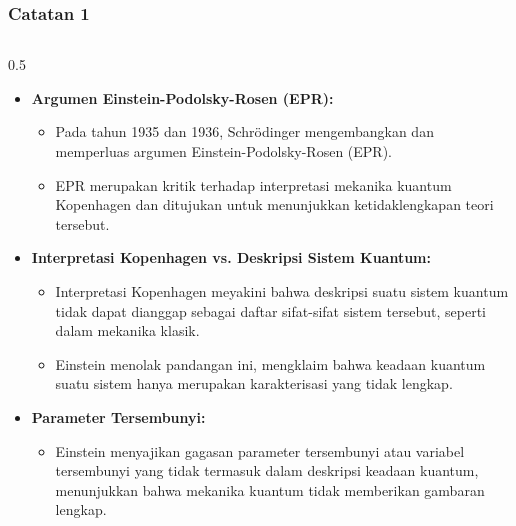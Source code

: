 \begin{frame}
\frametitle{Catatan 1}
    \begin{columns} %
        \begin{column}{0.5\textwidth}
        \justifying %
        \tiny %
        \vspace{-0.5 cm}
            \begin{itemize}
            \justifying %
            \tiny %
                \item \textbf{Argumen Einstein-Podolsky-Rosen (EPR):}
                    \begin{itemize}      \justifying \tiny 
                        \item Pada tahun 1935 dan 1936, Schrödinger mengembangkan dan memperluas argumen Einstein-Podolsky-Rosen (EPR).
                        \item EPR merupakan kritik terhadap interpretasi mekanika kuantum Kopenhagen dan ditujukan untuk menunjukkan ketidaklengkapan teori tersebut.
                    \end{itemize}
                
                \item \textbf{Interpretasi Kopenhagen vs. Deskripsi Sistem Kuantum:}
                    \begin{itemize} \justifying \tiny 
                        \item Interpretasi Kopenhagen meyakini bahwa deskripsi suatu sistem kuantum tidak dapat dianggap sebagai daftar sifat-sifat sistem tersebut, seperti dalam mekanika klasik.
                        \item Einstein menolak pandangan ini, mengklaim bahwa keadaan kuantum suatu sistem hanya merupakan karakterisasi yang tidak lengkap.
                    \end{itemize}
                
                \item \textbf{Parameter Tersembunyi:}
                    \begin{itemize} \justifying \tiny 
                        \item Einstein menyajikan gagasan parameter tersembunyi atau variabel tersembunyi yang tidak termasuk dalam deskripsi keadaan kuantum, menunjukkan bahwa mekanika kuantum tidak memberikan gambaran lengkap.
                    \end{itemize}
                

\end{itemize}
\end{column}
\end{columns}
\end{frame}
